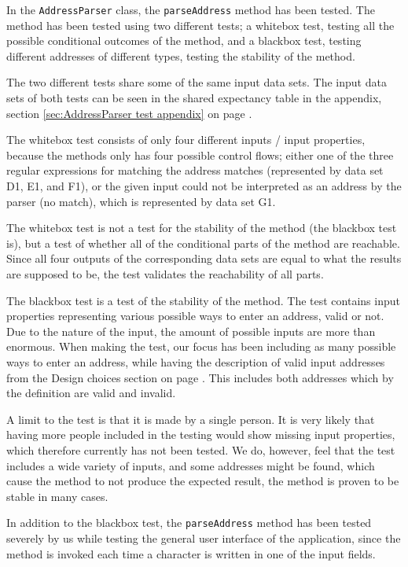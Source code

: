 In the \texttt{AddressParser} class, the \texttt{parseAddress} method has been tested. The method has been tested using two different tests; a whitebox test, testing all the possible conditional outcomes of the method, and a blackbox test, testing different addresses of different types, testing the stability of the method.

The two different tests share some of the same input data sets. The input data sets of both tests can be seen in the shared expectancy table in the appendix, section \ref{sec:AddressParser test appendix} on page \pageref{sec:AddressParser test appendix}.

The whitebox test consists of only four different inputs / input properties, because the methods only has four possible control flows; either one of the three regular expressions for matching the address matches (represented by data set D1, E1, and F1), or the given input could not be interpreted as an address by the parser (no match), which is represented by data set G1.

The whitebox test is not a test for the stability of the method (the blackbox test is), but a test of whether all of the conditional parts of the method are reachable. Since all four outputs of the corresponding data sets are equal to what the results are supposed to be, the test validates the reachability of all parts.

The blackbox test is a test of the stability of the method. The test contains input properties representing various possible ways to enter an address, valid or not. Due to the nature of the input, the amount of possible inputs are more than enormous. When making the test, our focus has been including as many possible ways to enter an address,   while having the description of valid input addresses from the Design choices section on page \pageref{sec: What is a valid address}. This includes both addresses which by the definition are valid and invalid.

A limit to the test is that it is made by a single person. It is very likely that having more people included in the testing would show missing input properties, which therefore currently has not been tested. We do, however, feel that the test includes a wide variety of inputs, and some addresses might be found, which cause the method to not produce the expected result, the method is proven to be stable in many cases.

In addition to the blackbox test, the \texttt{parseAddress} method has been tested severely by us while testing the general user interface of the application, since the method is invoked each time a character is written in one of the input fields.
